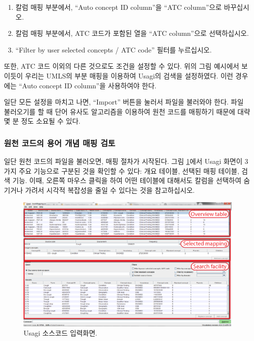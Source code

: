 \documentclass[10.5pt]{book}
\providecommand{\tightlist}{%
  \setlength{\itemsep}{0pt}\setlength{\parskip}{0pt}}
\theoremstyle{definition}
\theoremstyle{definition}
\theoremstyle{definition}
\theoremstyle{remark}
\begin{document}
\begin{enumerate}
\def\labelenumi{\arabic{enumi}.}
\tightlist
\item
  칼럼 매핑 부분에서, ``Auto concept ID column''을 ``ATC column''으로
  바꾸십시오.
\item
  칼럼 매핑 부분에서, ATC 코드가 포함된 열을 ``ATC column''으로
  선택하십시오.
\item
  ``Filter by user selected concepts / ATC code'' 필터를 누르십시오.
\end{enumerate}

또한, ATC 코드 이외의 다른 것으로도 조건을 설정할 수 있다. 위의 그림
예시에서 보이듯이 우리는 UMLS의 부분 매핑을 이용하여 Usagi의 검색을
설정하였다. 이런 경우에는 ``Auto concept ID column''을 사용하여야 한다.

일단 모든 설정을 마치고 나면, ``Import'' 버튼을 눌러서 파일을 불러와야
한다. 파일 불러오기를 할 때 단어 유사도 알고리즘을 이용하여 원천 코드를
매핑하기 때문에 대략 몇 분 정도 소요될 수 있다.

\subsubsection*{원천 코드의 용어 개념 매핑 검토}\label{-----}

일단 원천 코드의 파일을 불러오면, 매핑 절차가 시작된다. 그림
\ref{fig:usagiOverview}에서 Usagi 화면이 3가지 주요 기능으로 구분된 것을
확인할 수 있다: 개요 테이블, 선택된 매핑 테이블, 검색 기능. 이때, 오른쪽
마우스 클릭을 하여 어떤 테이블에 대해서도 칼럼을 선택하여 숨기거나
가려서 시각적 복잡성을 줄일 수 있다는 것을 참고하십시오.

\begin{figure}

{\centering \includegraphics[width=1\linewidth]{images/ExtractTransformLoad/usagiOverview} 

}

\caption{Usagi 소스코드 입력화면.}\label{fig:usagiOverview}
\end{figure}
\end{document}
